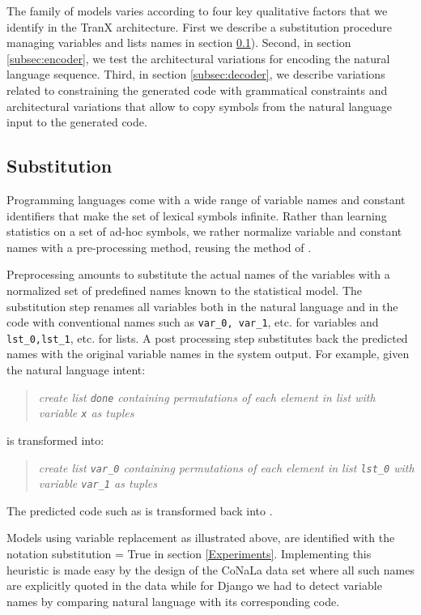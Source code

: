 \documentclass[11pt]{article}
\newcommand{\var}{\sc}
\begin{document}
The family of models varies according to four key qualitative factors that we identify in the {\selectfont TranX} architecture. First we describe a substitution procedure managing variables and lists names in section \ref{Preprocessing}). 
Second, in section \ref{subsec:encoder}, we test the architectural variations for encoding the natural language sequence.
Third, in section \ref{subsec:decoder}, we describe variations related to constraining the generated code with grammatical constraints and architectural variations that allow to  copy symbols from the natural language input to the generated code.


\subsection{Substitution} \label{Preprocessing}

Programming languages come with a wide range of variable names and constant identifiers that make the set of lexical symbols infinite.  Rather than learning statistics on a set of ad-hoc symbols, we rather normalize variable and constant names with a pre-processing method, reusing the method of \citet{tranx-2018}.

Preprocessing amounts to substitute the actual names of the variables with a normalized set of predefined names known to the statistical model. The substitution step renames all variables both in the natural language and in the code with conventional names such as \verb+var_0, var_1+, etc. for variables and \verb+lst_0,lst_1+, etc. for lists. A post processing step substitutes back the predicted names with the original variable names in the system output.  For example, given the natural language intent:
\begin{quote}
\textit{create list \texttt{\textasciigrave done\textasciigrave} containing permutations of each element in list \texttt{\textasciigrave [a, b, c, d]\textasciigrave} with variable \texttt{\textasciigrave x\textasciigrave} as tuples}
\end{quote}
is transformed into:
\begin{quote}
\textit{create list \texttt{var\_0} containing permutations of each element in list \texttt{lst\_0} with variable \texttt{var\_1} as tuples}
\end{quote}
The predicted code such as  is transformed back into .

Models using variable replacement as illustrated above, are identified with the notation {\var substitution = True} in section \ref{Experiments}. Implementing this heuristic is made easy by the design of the {\selectfont CoNaLa} data set where all such names are explicitly quoted in the data while for {\selectfont Django} we had to detect variable names by comparing natural language with its corresponding code.
\end{document}
